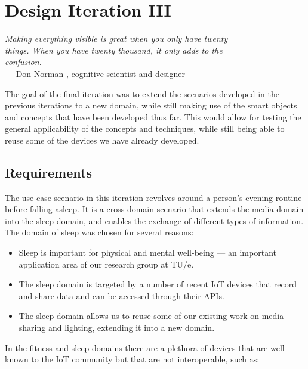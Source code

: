 \chapter{Design Iteration III}
\label{DesignIteration3}

\begin{flushright}{\slshape    
Making everything visible is great when you only have twenty\\
things. When you have twenty thousand, it only adds to the\\
confusion.} \\ \medskip
    ---  Don Norman \cite{Norman1999}, cognitive scientist and designer
\end{flushright}


The goal of the final iteration was to extend the scenarios developed in the previous iterations to a new domain, while still making use of the smart objects and concepts that have been developed thus far. This would allow for testing the general applicability of the concepts and techniques, while still being able to reuse some of the devices we have already developed.

\section{Requirements}

The use case scenario in this iteration revolves around a person's evening routine before falling asleep. It is a cross-domain scenario that extends the media domain into the sleep domain, and enables the exchange of different types of information. The domain of sleep was chosen for several reasons:

\begin{itemize}
\item Sleep is important for physical and mental well-being --- an important application area of our research group at TU/e.
\item The sleep domain is targeted by a number of recent \ac{IoT} devices that record and share data and can be accessed through their \acp{API}.
\item 	The sleep domain allows us to reuse some of our existing work on media sharing and lighting, extending it into a new domain.
\end{itemize}

In the fitness and sleep domains there are a plethora of devices that are well-known to the \ac{IoT} community but that are not interoperable, such as:

